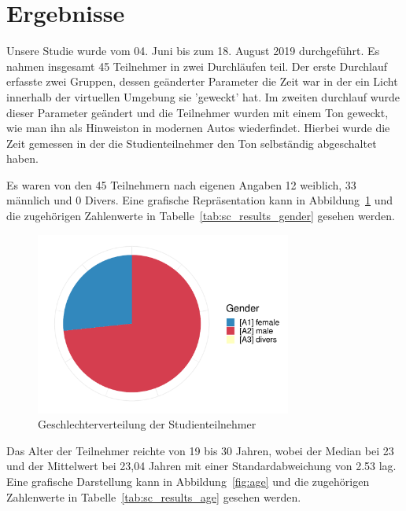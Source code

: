 \section{Ergebnisse}


Unsere Studie wurde vom 04. Juni bis zum 18. August 2019 durchgeführt. Es nahmen insgesamt 45 Teilnehmer in zwei Durchläufen teil. Der erste Durchlauf erfasste zwei Gruppen, dessen geänderter Parameter die Zeit war in der ein Licht innerhalb der virtuellen Umgebung sie 'geweckt' hat. Im zweiten durchlauf wurde dieser Parameter geändert und die Teilnehmer wurden mit einem Ton geweckt, wie man ihn als Hinweiston in modernen Autos wiederfindet. Hierbei wurde die Zeit gemessen in der die Studienteilnehmer den Ton selbständig abgeschaltet haben. 

Es waren von den 45 Teilnehmern nach eigenen Angaben 12 weiblich, 33 männlich und 0 Divers. Eine grafische Repräsentation kann in Abbildung~\ref{fig:gender} und die zugehörigen Zahlenwerte in Tabelle~\ref{tab:sc_results_gender} gesehen werden. 

\begin{figure}
	\includegraphics[width=0.75\textwidth]{./appendices/gender}
	\caption{Geschlechterverteilung der Studienteilnehmer}
	\label{fig:gender}
\end{figure}

Das Alter der Teilnehmer reichte von 19 bis 30 Jahren, wobei der Median bei 23 und der Mittelwert bei 23,04 Jahren mit einer Standardabweichung von 2.53 lag. Eine grafische Darstellung kann in Abbildung~\ref{fig:age} und die zugehörigen Zahlenwerte in Tabelle~\ref{tab:sc_results_age} gesehen werden.

